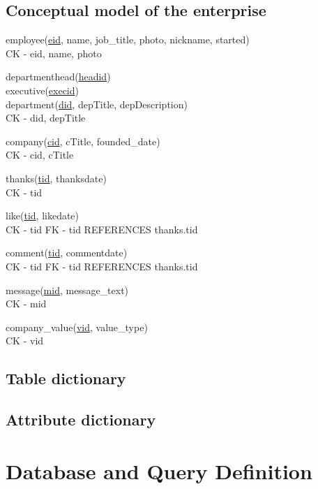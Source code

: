 \documentclass[11pt]{report}
\begin{document}
\section{Conceptual model of the enterprise}
employee(\underline{eid}, name, job\_title, photo, nickname, started) \\

    CK - eid, name, photo

departmenthead(\underline{headid}) \\

executive(\underline{execid}) \\

department(\underline{did}, depTitle, depDescription) \\

    CK - did, depTitle

company(\underline{cid}, cTitle, founded\_date) \\

    CK - cid, cTitle

thanks(\underline{tid}, thanksdate) \\

    CK - tid

like(\underline{tid}, likedate) \\

    CK - tid
    FK - tid REFERENCES thanks.tid

comment(\underline{tid}, commentdate) \\

    CK - tid
    FK - tid REFERENCES thanks.tid

message(\underline{mid}, message\_text) \\

    CK - mid

company\_value(\underline{vid}, value\_type) \\

    CK - vid
\clearpage
\section{Table dictionary}
\section{Attribute dictionary}

\chapter{Database and Query Definition}
\end{document}
